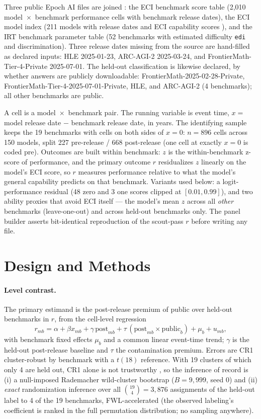 \documentclass[11pt]{article}
\begin{document}
Three public Epoch AI files are joined \cite{epochai}: the ECI benchmark
score table (2{,}010 model~$\times$~benchmark performance cells with
benchmark release dates), the ECI model index (211 models with release dates
and ECI capability scores \cite{ho2025}), and the IRT benchmark parameter
table (52 benchmarks with estimated difficulty \texttt{edi} and
discrimination). Three release dates missing from the source are hand-filled
as declared inputs: HLE 2025-01-23, ARC-AGI-2 2025-03-24, and
FrontierMath-Tier-4-Private 2025-07-01. The held-out classification is
likewise declared, by whether answers are publicly downloadable:
FrontierMath-2025-02-28-Private, FrontierMath-Tier-4-2025-07-01-Private,
HLE, and ARC-AGI-2 (4 benchmarks); all other benchmarks are public.

A cell is a model~$\times$~benchmark pair. The running variable is event
time, $x = $ model release date $-$ benchmark release date, in years. The
identifying sample keeps the 19 benchmarks with cells on both sides of
$x=0$: $n=896$ cells across 150 models, split 227 pre-release / 668
post-release (one cell at exactly $x=0$ is coded pre). Outcomes are built
within benchmark: $z$ is the within-benchmark z-score of performance, and
the primary outcome $r$ residualizes $z$ linearly on the model's ECI score,
so $r$ measures performance relative to what the model's general capability
predicts on that benchmark. Variants used below: a logit-performance
residual (48 zero and 3 one scores clipped at $[0.01,0.99]$), and two
ability proxies that avoid ECI itself --- the model's mean $z$ across all
\emph{other} benchmarks (leave-one-out) and across held-out benchmarks only.
The panel builder asserts bit-identical reproduction of the scout-pass $r$
before writing any file.

\section{Design and Methods}\label{sec:methods}

\paragraph{Level contrast.} The primary estimand is the post-release premium
of public over held-out benchmarks in $r$, from the cell-level regression
\begin{equation*}
r_{mb} = \alpha + \beta x_{mb} + \gamma\,\mathrm{post}_{mb}
+ \tau\,(\mathrm{post}_{mb} \times \mathrm{public}_b) + \mu_b + u_{mb},
\end{equation*}
with benchmark fixed effects $\mu_b$ and a common linear event-time trend;
$\gamma$ is the held-out post-release baseline and $\tau$ the contamination
premium. Errors are CR1 cluster-robust by benchmark with a $t(18)$
reference. With 19 clusters of which only 4 are held out, CR1 alone is not
trustworthy \cite{cameron2015}, so the inference of record is (i) a
null-imposed Rademacher wild-cluster bootstrap ($B=9{,}999$, seed 0) and
(ii) \emph{exact} randomization inference over all $\binom{19}{4}=3{,}876$
assignments of the held-out label to 4 of the 19 benchmarks,
FWL-accelerated (the observed labeling's coefficient is ranked in the full
permutation distribution; no sampling anywhere).
\end{document}
